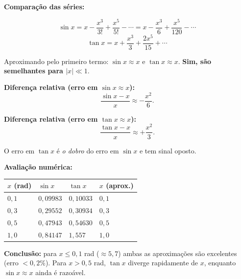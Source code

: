 \textbf{Comparação das séries:}

\[
\sin x = x - \frac{x^3}{3!} + \frac{x^5}{5!} - \cdots = x - \frac{x^3}{6} + \frac{x^5}{120} - \cdots
\]
\[
\tan x = x + \frac{x^3}{3} + \frac{2x^5}{15} + \cdots
\]

Aproximando pelo primeiro termo: $\sin x \approx x$ e $\tan x \approx x$. \textbf{Sim, são semelhantes para $|x|\ll1$}.

\textbf{Diferença relativa (erro em $\sin x \approx x$):}
\[
\frac{\sin x - x}{x}\approx -\frac{x^2}{6}.
\]

\textbf{Diferença relativa (erro em $\tan x \approx x$):}
\[
\frac{\tan x - x}{x}\approx +\frac{x^2}{3}.
\]

O erro em $\tan x$ é \emph{o dobro} do erro em $\sin x$ e tem sinal oposto.

\textbf{Avaliação numérica:}
\begin{center}
\begin{tabular}{llll}
\hline
$x$ (rad) & $\sin x$ & $\tan x$ & $x$ (aprox.) \\
\hline
$0{,}1$ & $0{,}09983$ & $0{,}10033$ & $0{,}1$ \\
$0{,}3$ & $0{,}29552$ & $0{,}30934$ & $0{,}3$ \\
$0{,}5$ & $0{,}47943$ & $0{,}54630$ & $0{,}5$ \\
$1{,}0$ & $0{,}84147$ & $1{,}557$ & $1{,}0$ \\
\hline
\end{tabular}
\end{center}

\textbf{Conclusão:} para $x\leq0{,}1$ rad ($\approx5{,}7$\textdegree) ambas as aproximações são excelentes (erro $<0{,}2\%$). Para $x>0{,}5$ rad, $\tan x$ diverge rapidamente de $x$, enquanto $\sin x\approx x$ ainda é razoável. 